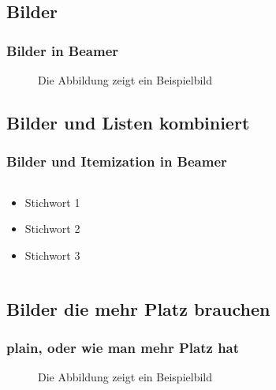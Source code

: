 \documentclass{beamer}
\begin{document}
\subsection{Bilder} 
\begin{frame}\frametitle{Bilder in Beamer}
\begin{figure}
\caption{Die Abbildung zeigt ein Beispielbild}
\end{figure}
\end{frame}


\subsection{Bilder und Listen kombiniert} 

\begin{frame}
\frametitle{Bilder und Itemization in Beamer}
\begin{columns}
\begin{column}{5cm}
\begin{itemize}
\item<1-> Stichwort 1
\item<3-> Stichwort 2
\item<5-> Stichwort 3
\end{itemize}
\vspace{3cm} 
\end{column}
\begin{column}{5cm}
\begin{overprint}
\end{overprint}
\end{column}
\end{columns}
\end{frame}

\subsection{Bilder die mehr Platz brauchen} 
\begin{frame}[plain]
\frametitle{plain, oder wie man mehr Platz hat}
\begin{figure}
\caption{Die Abbildung zeigt ein Beispielbild}
\end{figure}
\end{frame}
\end{document}
